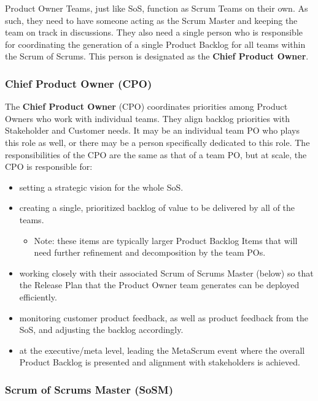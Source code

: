 \documentclass[12pt,a4paper,parskip=full]{scrartcl}
\begin{document}
Product Owner Teams, just like SoS, function as Scrum Teams on their own. As such, they need to have someone acting as the Scrum Master and keeping the team on track in discussions. They also need a single person who is responsible for coordinating the generation of a single Product Backlog for all teams within the Scrum of Scrums. This person is designated as the \textbf{Chief Product Owner}.

\subsubsection{Chief Product Owner (CPO)}

The \textbf{Chief Product Owner} (CPO) coordinates priorities among Product Owners who work with individual teams. They align backlog priorities with Stakeholder and Customer needs. It may be an individual team PO who plays this role as well, or there may be a person specifically dedicated to this role. The responsibilities of the CPO are the same as that of a team PO, but at scale, the CPO is responsible for:

\begin{itemize}
	\item setting a strategic vision for the whole SoS.
	\item creating a single, prioritized backlog of value to be delivered by all of the teams.
	\begin{itemize}
		\item Note: these items are typically larger Product Backlog Items that will need further refinement and decomposition by the team POs.
	\end{itemize}
	\item working closely with their associated Scrum of Scrums Master (below) so that the Release Plan that the Product Owner team generates can be deployed efficiently.
	\item monitoring customer product feedback, as well as product feedback from the SoS, and adjusting the backlog accordingly.
	\item at the executive/meta level, leading the MetaScrum event where the overall Product Backlog is presented and alignment with stakeholders is achieved.
\end{itemize}



\subsubsection{Scrum of Scrums Master (SoSM)}
\end{document}
